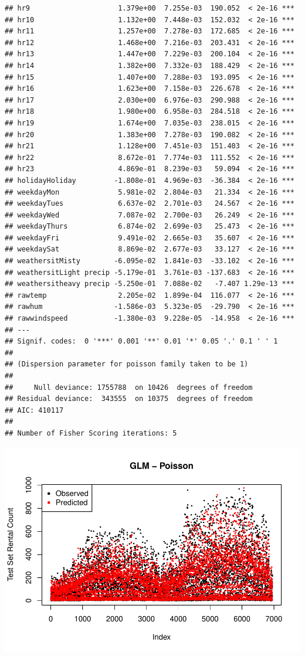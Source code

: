 \documentclass[
]{article}
\begin{document}
\begin{verbatim}
## hr9                     1.379e+00  7.255e-03  190.052  < 2e-16 ***
## hr10                    1.132e+00  7.448e-03  152.032  < 2e-16 ***
## hr11                    1.257e+00  7.278e-03  172.685  < 2e-16 ***
## hr12                    1.468e+00  7.216e-03  203.431  < 2e-16 ***
## hr13                    1.447e+00  7.229e-03  200.104  < 2e-16 ***
## hr14                    1.382e+00  7.332e-03  188.429  < 2e-16 ***
## hr15                    1.407e+00  7.288e-03  193.095  < 2e-16 ***
## hr16                    1.623e+00  7.158e-03  226.678  < 2e-16 ***
## hr17                    2.030e+00  6.976e-03  290.988  < 2e-16 ***
## hr18                    1.980e+00  6.958e-03  284.518  < 2e-16 ***
## hr19                    1.674e+00  7.035e-03  238.015  < 2e-16 ***
## hr20                    1.383e+00  7.278e-03  190.082  < 2e-16 ***
## hr21                    1.128e+00  7.451e-03  151.403  < 2e-16 ***
## hr22                    8.672e-01  7.774e-03  111.552  < 2e-16 ***
## hr23                    4.869e-01  8.239e-03   59.094  < 2e-16 ***
## holidayHoliday         -1.808e-01  4.969e-03  -36.384  < 2e-16 ***
## weekdayMon              5.981e-02  2.804e-03   21.334  < 2e-16 ***
## weekdayTues             6.637e-02  2.701e-03   24.567  < 2e-16 ***
## weekdayWed              7.087e-02  2.700e-03   26.249  < 2e-16 ***
## weekdayThurs            6.874e-02  2.699e-03   25.473  < 2e-16 ***
## weekdayFri              9.491e-02  2.665e-03   35.607  < 2e-16 ***
## weekdaySat              8.869e-02  2.677e-03   33.127  < 2e-16 ***
## weathersitMisty        -6.095e-02  1.841e-03  -33.102  < 2e-16 ***
## weathersitLight precip -5.179e-01  3.761e-03 -137.683  < 2e-16 ***
## weathersitheavy precip -5.250e-01  7.088e-02   -7.407 1.29e-13 ***
## rawtemp                 2.205e-02  1.899e-04  116.077  < 2e-16 ***
## rawhum                 -1.586e-03  5.323e-05  -29.790  < 2e-16 ***
## rawwindspeed           -1.380e-03  9.228e-05  -14.958  < 2e-16 ***
## ---
## Signif. codes:  0 '***' 0.001 '**' 0.01 '*' 0.05 '.' 0.1 ' ' 1
## 
## (Dispersion parameter for poisson family taken to be 1)
## 
##     Null deviance: 1755788  on 10426  degrees of freedom
## Residual deviance:  343555  on 10375  degrees of freedom
## AIC: 410117
## 
## Number of Fisher Scoring iterations: 5
\end{verbatim}

\includegraphics{test_files/figure-latex/unnamed-chunk-10-1.pdf}
\end{document}
